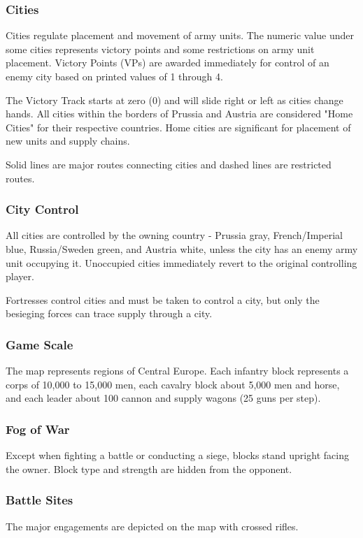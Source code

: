 \subsubsection{Cities}

Cities regulate placement and movement of army units. The numeric value under some cities represents victory points and some restrictions on army unit placement. Victory Points (VPs) are awarded immediately for control of an enemy city based on printed values of 1 through 4.

The Victory Track starts at zero (0) and will slide right or left as cities change hands. All cities within the borders of Prussia and Austria are considered "Home Cities" for their respective countries. Home cities are significant for placement of new units and supply chains.

Solid lines are major routes connecting cities and dashed lines are restricted routes.

\subsubsection{City Control}

All cities are controlled by the owning country - Prussia gray, French/Imperial blue, Russia/Sweden green, and Austria white, unless the city has an enemy army unit occupying it. Unoccupied cities immediately revert to the original controlling player.

Fortresses control cities and must be taken to control a city, but only the besieging forces can trace supply through a city.

\subsubsection{Game Scale}

The map represents regions of Central Europe. Each infantry block represents a corps of 10,000 to 15,000 men, each cavalry block about 5,000 men and horse, and each leader about 100 cannon and supply wagons (25 guns per step).

\subsubsection{Fog of War}

Except when fighting a battle or conducting a siege, blocks stand upright facing the owner. Block type and strength are hidden from the opponent.

\subsubsection{Battle Sites}

The major engagements are depicted on the map with crossed rifles.